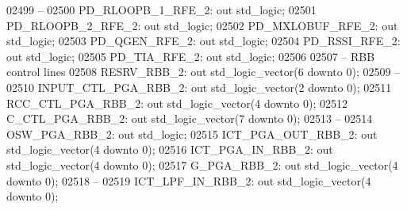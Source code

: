 \begin{DoxyCode}
02499 \textcolor{keyword}{    --}
02500     PD\_RLOOPB\_1\_RFE\_2:  \textcolor{keywordflow}{out} \textcolor{comment}{std\_logic};
02501     PD\_RLOOPB\_2\_RFE\_2:  \textcolor{keywordflow}{out} \textcolor{comment}{std\_logic};
02502     PD\_MXLOBUF\_RFE\_2:   \textcolor{keywordflow}{out} \textcolor{comment}{std\_logic};
02503     PD\_QGEN\_RFE\_2:  \textcolor{keywordflow}{out} \textcolor{comment}{std\_logic};
02504     PD\_RSSI\_RFE\_2:  \textcolor{keywordflow}{out} \textcolor{comment}{std\_logic};
02505     PD\_TIA\_RFE\_2:   \textcolor{keywordflow}{out} \textcolor{comment}{std\_logic};
02506 
02507 \textcolor{keyword}{    -- RBB control lines }
02508     RESRV\_RBB\_2:    \textcolor{keywordflow}{out} \textcolor{comment}{std\_logic\_vector}(\textcolor{vhdllogic}{}\textcolor{vhdllogic}{6} \textcolor{keywordflow}{downto} \textcolor{vhdllogic}{}\textcolor{vhdllogic}{0});
02509 \textcolor{keyword}{    --}
02510     INPUT\_CTL\_PGA\_RBB\_2:    \textcolor{keywordflow}{out} \textcolor{comment}{std\_logic\_vector}(\textcolor{vhdllogic}{}\textcolor{vhdllogic}{2} \textcolor{keywordflow}{downto} \textcolor{vhdllogic}{}\textcolor{vhdllogic}{0});
02511     RCC\_CTL\_PGA\_RBB\_2:  \textcolor{keywordflow}{out} \textcolor{comment}{std\_logic\_vector}(\textcolor{vhdllogic}{}\textcolor{vhdllogic}{4} \textcolor{keywordflow}{downto} \textcolor{vhdllogic}{}\textcolor{vhdllogic}{0});
02512     C\_CTL\_PGA\_RBB\_2:    \textcolor{keywordflow}{out} \textcolor{comment}{std\_logic\_vector}(\textcolor{vhdllogic}{}\textcolor{vhdllogic}{7} \textcolor{keywordflow}{downto} \textcolor{vhdllogic}{}\textcolor{vhdllogic}{0});
02513 \textcolor{keyword}{    --}
02514     OSW\_PGA\_RBB\_2:  \textcolor{keywordflow}{out} \textcolor{comment}{std\_logic};
02515     ICT\_PGA\_OUT\_RBB\_2:  \textcolor{keywordflow}{out} \textcolor{comment}{std\_logic\_vector}(\textcolor{vhdllogic}{}\textcolor{vhdllogic}{4} \textcolor{keywordflow}{downto} \textcolor{vhdllogic}{}\textcolor{vhdllogic}{0});
02516     ICT\_PGA\_IN\_RBB\_2:   \textcolor{keywordflow}{out} \textcolor{comment}{std\_logic\_vector}(\textcolor{vhdllogic}{}\textcolor{vhdllogic}{4} \textcolor{keywordflow}{downto} \textcolor{vhdllogic}{}\textcolor{vhdllogic}{0});
02517     G\_PGA\_RBB\_2:    \textcolor{keywordflow}{out} \textcolor{comment}{std\_logic\_vector}(\textcolor{vhdllogic}{}\textcolor{vhdllogic}{4} \textcolor{keywordflow}{downto} \textcolor{vhdllogic}{}\textcolor{vhdllogic}{0});
02518 \textcolor{keyword}{    --}
02519     ICT\_LPF\_IN\_RBB\_2:   \textcolor{keywordflow}{out} \textcolor{comment}{std\_logic\_vector}(\textcolor{vhdllogic}{}\textcolor{vhdllogic}{4} \textcolor{keywordflow}{downto} \textcolor{vhdllogic}{}\textcolor{vhdllogic}{0});

\end{DoxyCode}
